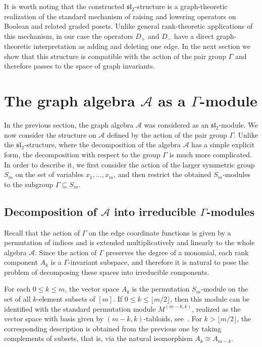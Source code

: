 \documentclass[12pt,reqno]{amsart}
\begin{document}
\medskip

It is worth noting that the constructed $\mathfrak{sl}_2$-structure is a
graph-theoretic realization of the standard mechanism of raising and lowering
operators on Boolean and related graded posets. Unlike general rank-theoretic
applications of this mechanism, in our case the operators $D_+$ and $D_-$ have
a direct graph-theoretic interpretation as adding and deleting one edge.
In the next section we show that this structure is compatible with the action
of the pair group $\Gamma$ and therefore passes to the space of graph
invariants.




\section{The graph algebra $\mathcal A$ as a 
$\Gamma$-module}


In the previous section, the graph algebra $\mathcal A$ was considered as an
$\mathfrak{sl}_2$-module. We now consider the structure on $\mathcal A$
defined by the action of the pair group
$
\Gamma.
$
Unlike the $\mathfrak{sl}_2$-structure, where the decomposition of the algebra
$\mathcal A$ has a simple explicit form, the decomposition with respect to the
group
$
\Gamma
$
is much more complicated. In order to describe it, we first consider the
action of the larger symmetric group
$
S_m
$
on the set of variables $x_1,\dots,x_m$, and then restrict the obtained
$S_m$-modules to the subgroup $\Gamma\subseteq S_m$.

\subsection{Decomposition of $\mathcal A$ into irreducible 
$\Gamma$-modules}

Recall that the action of $\Gamma$ on the edge coordinate functions is given
by a permutation of indices and is extended multiplicatively and linearly to
the whole algebra $\mathcal A$.
Since the action of $\Gamma$ preserves the degree of a monomial, each rank
component
$
A_k
$
is a $\Gamma$-invariant subspace, and therefore it is natural to pose the
problem of decomposing these spaces into irreducible components.

For each $0\le k\le m$, the vector space $A_k$ is the permutation
$S_m$-module on the set of all $k$-element subsets of $[m]$.
If $0\le k\le \lfloor m/2\rfloor$, then this module can be identified with
the standard permutation module $M^{(m-k,k)}$, realized as the vector space
with basis given by $(m-k,k)$-tabloids, see~\cite{Sagan}.
For $k>\lfloor m/2\rfloor$, the corresponding description is obtained from
the previous one by taking complements of subsets, that is, via the natural
isomorphism $A_k\cong A_{m-k}$.
\end{document}
